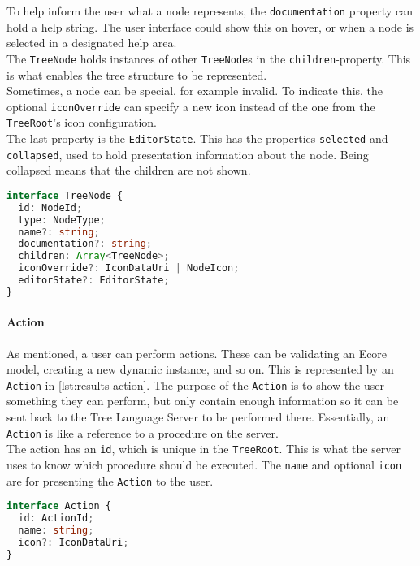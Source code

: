 To help inform the user what a node represents, the \texttt{documentation} property can hold a help string.
The user interface could show this on hover, or when a node is selected in a designated help area.\\

The \texttt{TreeNode} holds instances of other \texttt{TreeNode}s in the \texttt{children}-property.
This is what enables the tree structure to be represented.\\

Sometimes, a node can be special, for example invalid.
To indicate this, the optional \texttt{iconOverride} can specify a new icon instead of the one from the \texttt{TreeRoot}'s icon configuration.\\

The last property is the \texttt{EditorState}.
This has the properties \texttt{selected} and \texttt{collapsed}, used to hold presentation information about the node.
Being collapsed means that the children are not shown.

\begin{lstlisting}[language=Typescript, label={lst:result-tree-node}, caption={[TreeNode]TreeNode TypeScript code.}]
interface TreeNode {
  id: NodeId;
  type: NodeType;
  name?: string;
  documentation?: string;
  children: Array<TreeNode>;
  iconOverride?: IconDataUri | NodeIcon;
  editorState?: EditorState;
}
\end{lstlisting}


\paragraph{Action}
As mentioned, a user can perform actions.
These can be validating an \gls{Ecore} model, creating a new dynamic instance, and so on.
This is represented by an \texttt{Action} in \cref{lst:results-action}.
The purpose of the \texttt{Action} is to show the user something they can perform, but only contain enough information so it can be sent back to the Tree Language Server to be performed there.
Essentially, an \texttt{Action} is like a reference to a procedure on the server.\\

The action has an \texttt{id}, which is unique in the \texttt{TreeRoot}.
This is what the server uses to know which procedure should be executed.
The \texttt{name} and optional \texttt{icon} are for presenting the \texttt{Action} to the user.

\begin{lstlisting}[language=Typescript, label={lst:results-action}, caption={[Action]Action TypeScript code.}]
interface Action {
  id: ActionId;
  name: string;
  icon?: IconDataUri;
}
\end{lstlisting}

